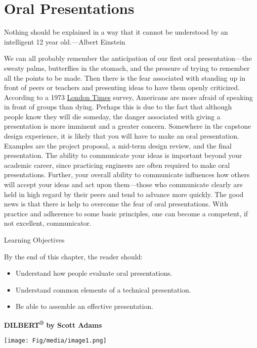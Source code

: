 \section{\texorpdfstring{ Oral
Presentations}{ Oral Presentations}}\label{oral-presentations}

Nothing should be explained in a way that it cannot be understood by an
intelligent 12 year old.---Albert Einstein

We can all probably remember the anticipation of our first oral
presentation---the sweaty palms, butterflies in the stomach, and the
pressure of trying to remember all the points to be made. Then there is
the fear associated with standing up in front of peers or teachers and
presenting ideas to have them openly criticized. According to a 1973
\ul{London Times} survey, Americans are more afraid of speaking in front
of groups than dying. Perhaps this is due to the fact that although
people know they will die someday, the danger associated with giving a
presentation is more imminent and a greater concern. Somewhere in the
capstone design experience, it is likely that you will have to make an
oral presentation. Examples are the project proposal, a mid-term design
review, and the final presentation. The ability to communicate your
ideas is important beyond your academic career, since practicing
engineers are often required to make oral presentations. Further, your
overall ability to communicate influences how others will accept your
ideas and act upon them---those who communicate clearly are held in high
regard by their peers and tend to advance more quickly. The good news is
that there is help to overcome the fear of oral presentations. With
practice and adherence to some basic principles, one can become a
competent, if not excellent, communicator.

Learning Objectives

By the end of this chapter, the reader should:

\begin{itemize}
\item
  Understand how people evaluate oral presentations.
\item
  Understand common elements of a technical presentation.
\item
  Be able to assemble an effective presentation.
\end{itemize}

\textbf{\hfill\break
DILBERT\textsuperscript{®} by Scott Adams}

\texttt{[image: Fig/media/image1.png]}

